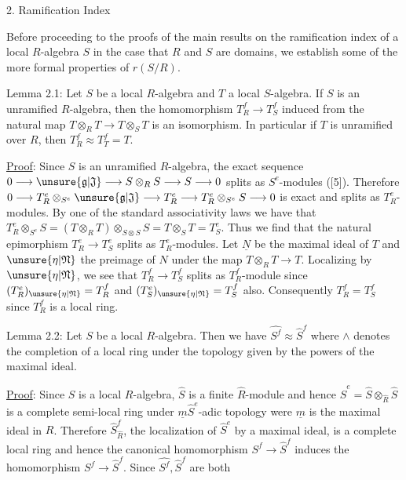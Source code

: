 2. Ramification Index

Before proceeding to the proofs of the main results on the ramification
index of a local $R$-algebra $S$ in the case that $R$ and $S$ are  domains,
we establish some of the more formal properties of $r(S/R)$.

Lemma 2.1: Let $S$ be a local $R$-algebra and $T$ a local $S$-algebra.
If $S$ is an unramified $R$-algebra, then the homomorphism $T_R^f\longrightarrow T_S^f$ induced
from the natural map $T\otimes_R T\longrightarrow T\otimes_S T$ is an isomorphism. In particular
if $T$ is unramified over $R$, then $T_R^f\approx T_T^f=T$.

\uline{Proof}: Since $S$ is an unramified $R$-algebra, the exact sequence
$0\longrightarrow\unsure{\mathfrak g|\mathfrak J}\longrightarrow S\otimes_R S\longrightarrow S\longrightarrow0$ splits as $S^e$-modules ([5]). Therefore
$0\longrightarrow T_R^e\otimes_{S^e}\unsure{\mathfrak g|\mathfrak J}\longrightarrow T_R^e\longrightarrow T_R^e\otimes_{S^e}S\longrightarrow0$ is exact and splits as $T_R^e$-
modules. By one of the standard associativity laws we have that $T_R^e\otimes_{S^e}S=
(T\otimes_R T)\otimes_{S\otimes S}S=T\otimes_S T=T_S^e$. Thus we find that the natural epimorphism
$T_R^e\longrightarrow T_S^e$ splits as $T_R^e$-modules. Let $\underline N$ be the maximal ideal of $T$ and $\unsure{\eta|\mathfrak N}$ the
preimage of $N$ under the map $T\otimes_R T\longrightarrow T$. Localizing by $\unsure{\eta|\mathfrak N}$, we see that
$T_R^f\longrightarrow T_S^f$ splits as $T_R^f$-module since $(T_R^e)_{\unsure{\eta|\mathfrak N}}=T_R^f$ and $(T_S^e)_{\unsure{\eta|\mathfrak N}}=T_S^f$ also.
Consequently $T_R^f=T_S^f$ since $T_R^f$ is a local ring.

Lemma 2.2: Let $S$ be a local $R$-algebra. Then we have $\widehat{S^f}\approx\widehat S^f$ where $\wedge$
denotes the completion of a local ring under the topology given by the
powers of the maximal ideal.

\uline{Proof}: Since $S$ is a local $R$-algebra, $\widehat S$ is a finite $\widehat R$-module and hence
$\widehat S^e=\widehat S\otimes_{\widehat R}\widehat S$ is a complete semi-local ring under $\underline m\widehat S^e$-adic topology were $\underline m$ is
the maximal ideal in $R$. Therefore $\widehat S_{\widehat R}^f$, the localization of $\widehat S^e$ by a maximal
ideal, is a complete local ring and hence the canonical homomorphism
$S^f\longrightarrow\widehat S^f$ induces the homomorphism $\widehat{S^f}\longrightarrow\widehat S^f$. Since $\widehat{S^f},\widehat S^f$ are both
